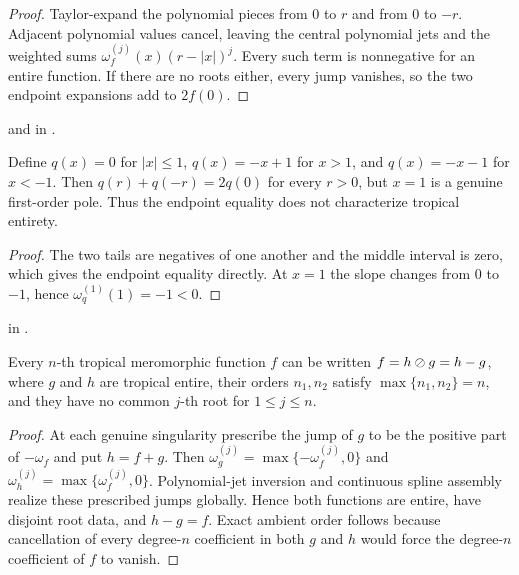 \begin{proof}
\leanok
Taylor-expand the polynomial pieces from $0$ to $r$ and from $0$ to $-r$.
Adjacent polynomial values cancel, leaving the central polynomial jets and
the weighted sums
$\omega_f^{(j)}(x)(r-|x|)^j$.  Every such term is nonnegative for an entire
function.  If there are no roots either, every jump vanishes, so the two
endpoint expansions add to $2f(0)$.
\end{proof}

\begin{leanproof}
 and
 in
.
\end{leanproof}

\begin{example}
\leanok
{}
Define $q(x)=0$ for $|x|\leq1$, $q(x)=-x+1$ for $x>1$, and
$q(x)=-x-1$ for $x<-1$.  Then
$q(r)+q(-r)=2q(0)$ for every $r>0$, but $x=1$ is a genuine first-order
pole.  Thus the endpoint equality does not characterize tropical entirety.
\end{example}

\begin{proof}
\leanok
The two tails are negatives of one another and the middle interval is zero,
which gives the endpoint equality directly.  At $x=1$ the slope changes from
$0$ to $-1$, hence $\omega_q^{(1)}(1)=-1<0$.
\end{proof}

\begin{leanproof}
 in .
\end{leanproof}

\begin{proposition}
\leanok
{}
Every $n$-th tropical meromorphic function $f$ can be written
$f=h\mathbin{\oslash} g=h-g$, where $g$ and $h$ are tropical entire, their orders
$n_1,n_2$ satisfy $\max\{n_1,n_2\}=n$, and they have no common $j$-th root
for $1\leq j\leq n$.
\end{proposition}

\begin{proof}
\leanok
At each genuine singularity prescribe the jump of $g$ to be the positive part
of $-\omega_f$ and put $h=f+g$.  Then
$\omega_g^{(j)}=\max\{-\omega_f^{(j)},0\}$ and
$\omega_h^{(j)}=\max\{\omega_f^{(j)},0\}$.  Polynomial-jet inversion and
continuous spline assembly realize these prescribed jumps globally.  Hence
both functions are entire, have disjoint root data, and $h-g=f$.  Exact
ambient order follows because cancellation of every degree-$n$ coefficient in
both $g$ and $h$ would force the degree-$n$ coefficient of $f$ to vanish.
\end{proof}


